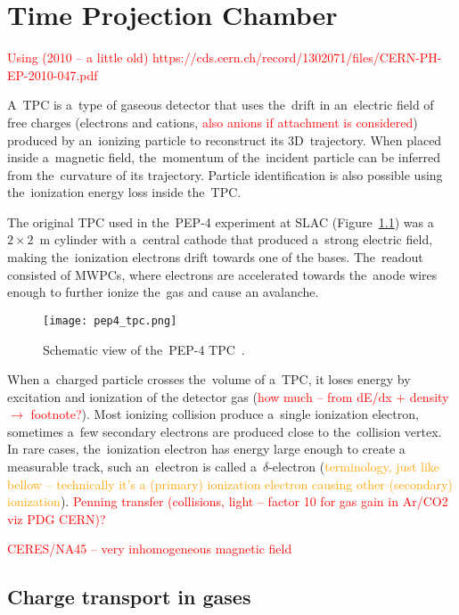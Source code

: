 \chapter{Time Projection Chamber}
\label{sec:tpc}
	\textcolor{red}{Using (2010 -- a little old) https://cds.cern.ch/record/1302071/files/CERN-PH-EP-2010-047.pdf}
	
	A~\acf{TPC} is a~type of gaseous detector that uses the~drift in an~electric field of free charges (electrons and cations, \textcolor{red}{also anions if attachment is considered}) produced by an~ionizing particle to reconstruct its 3D~trajectory. When placed inside a~magnetic field, the~momentum of the~incident particle can be inferred from the~curvature of its trajectory. Particle identification is also possible using the~ionization energy loss inside the~\ac{TPC}.
	
	The original \ac{TPC} used in the~PEP-4 experiment at SLAC (Figure~\ref{fig:pep4}) was a $2\times2$~m cylinder with a~central cathode that produced a~strong electric field, making the~ionization electrons drift towards one of the bases. The~readout consisted of \ac{MWPC}s, where electrons are accelerated towards the~anode wires enough to further ionize the~gas and cause an avalanche.
	
	\begin{figure}
		\centering
		\texttt{[image: pep4\_tpc.png]}
		\caption{Schematic view of the~PEP-4 \ac{TPC}~\cite{pep4}.}
		\label{fig:pep4}
	\end{figure}
	
	When a~charged particle crosses the~volume of a~\ac{TPC}, it loses energy by excitation and ionization of the detector gas (\textcolor{red}{how much -- from dE/dx + density $\rightarrow$ footnote?}). Most ionizing collision produce a~single ionization electron, sometimes a~few secondary electrons are produced close to the~collision vertex. In rare cases, the~ionization electron has energy large enough to create a measurable track, such an~electron is called a~$\delta$\nobreakdash-electron (\textcolor{orange}{terminology, just like bellow -- technically it's a (primary) ionization electron causing other (secondary) ionization}). \textcolor{red}{Penning transfer (collisions, light -- factor 10 for gas gain in Ar/CO2 viz PDG CERN)?}
	
	\textcolor{red}{CERES/NA45 -- very inhomogeneous magnetic field}
	
	\section{Charge transport in gases}
